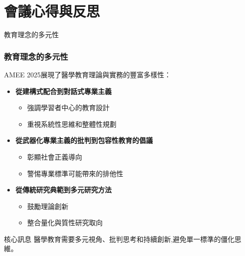 \documentclass[aspectratio=169]{beamer}
\begin{document}
\section{會議心得與反思}

\begin{frame}{教育理念的多元性}
\frametitle{教育理念的多元性}

AMEE 2025展現了醫學教育理論與實務的豐富多樣性：

\begin{itemize}
    \item \textbf{從建構式配合到對話式專業主義}
    \begin{itemize}
        \item 強調學習者中心的教育設計
        \item 重視系統性思維和整體性規劃
    \end{itemize}
    
    \item \textbf{從武器化專業主義的批判到包容性教育的倡議}
    \begin{itemize}
        \item 彰顯社會正義導向
        \item 警惕專業標準可能帶來的排他性
    \end{itemize}
    
    \item \textbf{從傳統研究典範到多元研究方法}
    \begin{itemize}
        \item 鼓勵理論創新
        \item 整合量化與質性研究取向
    \end{itemize}
\end{itemize}

\vspace{0.5cm}

\begin{alertblock}{核心訊息}
醫學教育需要多元視角、批判思考和持續創新,避免單一標準的僵化思維。
\end{alertblock}
\end{frame}
\end{document}
